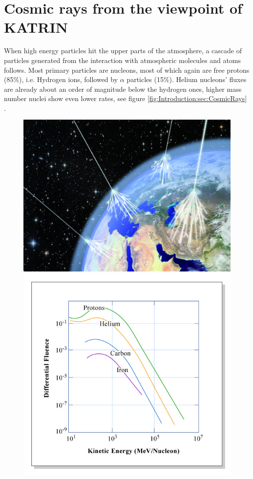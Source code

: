 	\section{Cosmic rays from the viewpoint of KATRIN}
    \label{ch:Introduction:sec:Cosmic Air Showers}
    When high energy particles hit the upper parts of the atmosphere, a cascade of particles generated from the interaction with atmospheric molecules and atoms follows. Most primary particles are nucleons, most of which again are free protons (85\%), i.e. Hydrogen ions, followed by $\alpha$ particles (15\%). Helium nucleons' fluxes are already about an order of magnitude below the hydrogen ones, higher mass number nuclei show even lower rates, see figure \ref{fig:Introduction:sec:CosmicRays} \cite{highEnergyCosmicRays}.
    \begin{figure}
	\begin{minipage}[d]{0.49 \textwidth}
		  \includegraphics[width=\textwidth]{graphics/cosmicRays/cosmicRays.jpg}
	\end{minipage}
	\begin{minipage}[d]{0.49 \textwidth}
		  \includegraphics[width=\textwidth]{graphics/cosmicRays/energySpectrum.jpg}

\end{minipage}
\end{figure}
